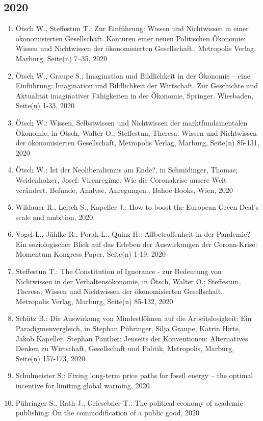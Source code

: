 \subsection*{2020}
\begin{enumerate}
    	 \item Ötsch W., Steffestun T.: Zur Einführung: Wissen und Nichtwissen in einer ökonomisierten Gesellschaft. Konturen einer neuen Politischen Ökonomie: Wissen und Nichtwissen der ökonomisierten Gesellschaft., Metropolis Verlag, Marburg, Seite(n) 7–35, 2020
	 \item Ötsch W., Graupe S.: Imagination und Bildlichkeit in der Ökonomie – eine Einführung: Imagination und Bildlichkeit der Wirtschaft. Zur Geschichte und Aktualität imaginativer Fähigkeiten in der Ökonomie, Springer, Wiesbaden, Seite(n) 1-33, 2020
	 \item Ötsch W.: Wissen, Selbstwissen und Nichtwissen der marktfundamentalen Ökonomie, in Ötsch, Walter O.; Steffestun, Theresa: Wissen und Nichtwissen der ökonomisierten Gesellschaft, Metropolis Verlag, Marburg, Seite(n) 85-131, 2020
	 \item Ötsch W.: Ist der Neoliberalismus am Ende?, in Schmidinger, Thomas; Weidenholzer, Josef: Virenregime. Wie die Coronakrise unsere Welt verändert. Befunde, Analyse, Anregungen., Bahoe Books, Wien, 2020
	 \item Wildauer R., Leitch S., Kapeller J.: How to boost the European Green Deal’s scale and ambition, 2020
	 \item Vogel L., Jühlke R., Porak L., Quinz H.: Allbetroffenheit in der Pandemie? Ein soziologischer Blick auf das Erleben der Auswirkungen der Corona-Krise: Momentum Kongress Paper, Seite(n) 1-19, 2020
	 \item Steffestun T.: The Constitution of Ignorance - zur Bedeutung von Nichtwissen in der Verhaltensökonomie, in Ötsch, Walter O.; Steffestun, Theresa: Wissen und Nichtwissen der ökonomisierten Gesellschaft., Metropolis Verlag, Marburg, Seite(n) 85-132, 2020
	 \item Schütz B.: Die Auswirkung von Mindestlöhnen auf die Arbeitslosigkeit: Ein Paradigmenvergleich, in Stephan Pühringer, Silja Graupe, Katrin Hirte, Jakob Kapeller, Stephan Panther: Jenseits der Konventionen: Alternatives Denken zu Wirtschaft, Gesellschaft und Politik, Metropolis, Marburg, Seite(n) 157-173, 2020
	 \item Schulmeister S.: Fixing long-term price paths for fossil energy – the optimal incentive for limiting global warming, 2020
	 \item Pühringer S., Rath J., Griesebner T.: The political economy of academic publishing: On the commodification of a public good, 2020

\end{enumerate}
